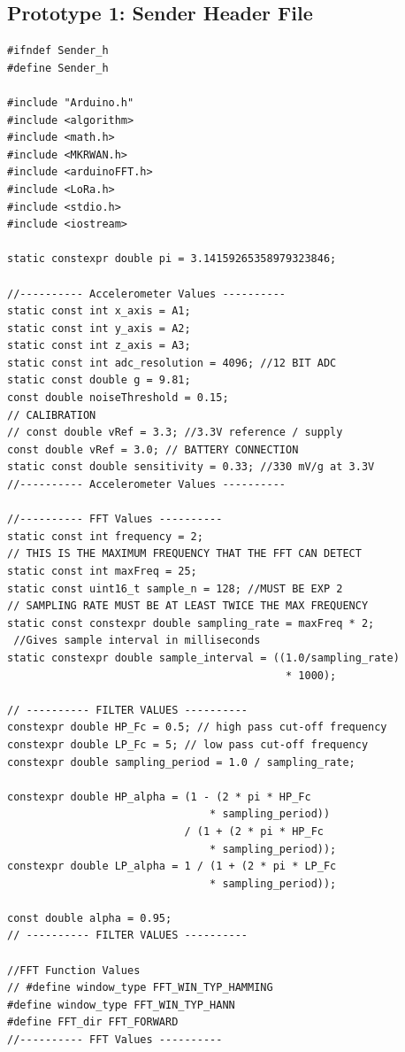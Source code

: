 \subsection{Prototype 1: Sender Header File}
\begin{verbatim}
#ifndef Sender_h
#define Sender_h

#include "Arduino.h"
#include <algorithm>
#include <math.h>
#include <MKRWAN.h>
#include <arduinoFFT.h>
#include <LoRa.h>
#include <stdio.h>
#include <iostream> 

static constexpr double pi = 3.14159265358979323846;

//---------- Accelerometer Values ----------
static const int x_axis = A1;
static const int y_axis = A2;
static const int z_axis = A3;
static const int adc_resolution = 4096; //12 BIT ADC
static const double g = 9.81;
const double noiseThreshold = 0.15;
// CALIBRATION
// const double vRef = 3.3; //3.3V reference / supply
const double vRef = 3.0; // BATTERY CONNECTION
static const double sensitivity = 0.33; //330 mV/g at 3.3V
//---------- Accelerometer Values ----------

//---------- FFT Values ----------
static const int frequency = 2;
// THIS IS THE MAXIMUM FREQUENCY THAT THE FFT CAN DETECT
static const int maxFreq = 25; 
static const uint16_t sample_n = 128; //MUST BE EXP 2
// SAMPLING RATE MUST BE AT LEAST TWICE THE MAX FREQUENCY
static const constexpr double sampling_rate = maxFreq * 2; 
 //Gives sample interval in milliseconds
static constexpr double sample_interval = ((1.0/sampling_rate) 
                                            * 1000);

// ---------- FILTER VALUES ----------
constexpr double HP_Fc = 0.5; // high pass cut-off frequency 
constexpr double LP_Fc = 5; // low pass cut-off frequency
constexpr double sampling_period = 1.0 / sampling_rate;

constexpr double HP_alpha = (1 - (2 * pi * HP_Fc 
                                * sampling_period)) 
                            / (1 + (2 * pi * HP_Fc 
                                * sampling_period));
constexpr double LP_alpha = 1 / (1 + (2 * pi * LP_Fc 
                                * sampling_period));

const double alpha = 0.95;
// ---------- FILTER VALUES ----------

//FFT Function Values
// #define window_type FFT_WIN_TYP_HAMMING
#define window_type FFT_WIN_TYP_HANN
#define FFT_dir FFT_FORWARD
//---------- FFT Values ----------


\end{verbatim}
